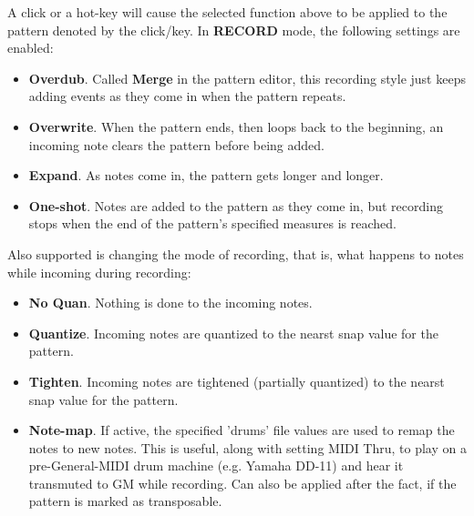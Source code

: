    A click or a hot-key will cause the selected function above to be applied to
   the pattern denoted by the click/key.
   In \textbf{RECORD} mode, the following settings are enabled:

   \begin{itemize}
      \item \textbf{Overdub}.
         Called \textbf{Merge} in the pattern editor, this recording
         style just keeps adding events as they come in when the
         pattern repeats.
      \item \textbf{Overwrite}.
         When the pattern ends, then loops back to the beginning,
         an incoming note clears the pattern before being added.
      \item \textbf{Expand}.
         As notes come in, the pattern gets longer and longer.
      \item \textbf{One-shot}.
         Notes are added to the pattern as they come in, but recording
         stops when the end of the pattern's specified measures is
         reached.
   \end{itemize}

   Also supported is changing the mode of recording, that is, what happens
   to notes while incoming during recording:

   \begin{itemize}
      \item \textbf{No Quan}.
         Nothing is done to the incoming notes.
      \item \textbf{Quantize}.
         Incoming notes are quantized to the nearst snap value for the
         pattern.
      \item \textbf{Tighten}.
         Incoming notes are tightened (partially quantized)
         to the nearst snap value for the pattern.
      \item \textbf{Note-map}.
         If active, the specified 'drums' file values are used to remap the
         notes to new notes. This is useful, along with setting MIDI Thru, to
         play on a pre-General-MIDI drum machine (e.g. Yamaha DD-11) and
         hear it transmuted to GM while recording. Can also be applied after
         the fact, if the pattern is marked as transposable.
      \end{itemize}

